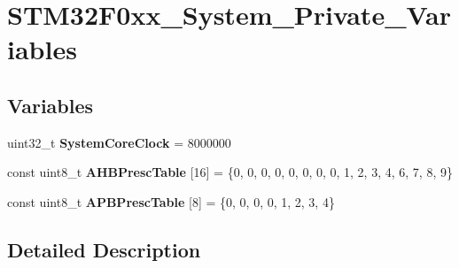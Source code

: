 \hypertarget{group___s_t_m32_f0xx___system___private___variables}{}\section{S\+T\+M32\+F0xx\+\_\+\+System\+\_\+\+Private\+\_\+\+Variables}
\label{group___s_t_m32_f0xx___system___private___variables}
\subsection*{Variables}
\begin{DoxyCompactItemize}
\item 
\mbox{\label{group___s_t_m32_f0xx___system___private___variables_gaa3cd3e43291e81e795d642b79b6088e6}} 
uint32\+\_\+t {\bfseries System\+Core\+Clock} = 8000000
\item 
\mbox{\label{group___s_t_m32_f0xx___system___private___variables_ga6e1d9cd666f0eacbfde31e9932a93466}} 
const uint8\+\_\+t {\bfseries A\+H\+B\+Presc\+Table} \mbox{[}16\mbox{]} = \{0, 0, 0, 0, 0, 0, 0, 0, 1, 2, 3, 4, 6, 7, 8, 9\}
\item 
\mbox{\label{group___s_t_m32_f0xx___system___private___variables_ga5b4f8b768465842cf854a8f993b375e9}} 
const uint8\+\_\+t {\bfseries A\+P\+B\+Presc\+Table} \mbox{[}8\mbox{]} = \{0, 0, 0, 0, 1, 2, 3, 4\}
\end{DoxyCompactItemize}


\subsection{Detailed Description}

